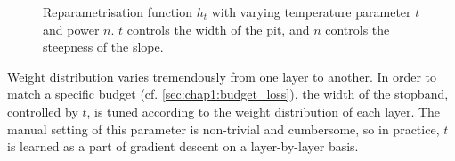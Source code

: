 \begin{figure}
    \centering
      \caption{
    Reparametrisation function $h_t$ with varying temperature parameter $t$ and
    power $n$. $t$ controls the width of the pit, and $n$ controls the steepness
    of the slope.}
    \label{fig:stopband}
\end{figure}

Weight distribution varies tremendously from one layer to another. In order to
match a specific budget (cf. \cref{sec:chap1:budget_loss}), the width of the
stopband, controlled by $t$, is tuned according to the weight distribution of
each layer. The manual setting of this parameter is non-trivial and cumbersome,
so in practice, $t$ is learned as a part of gradient descent on a layer-by-layer
basis.\\

